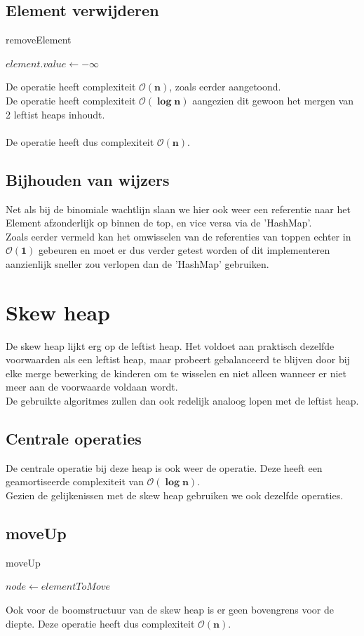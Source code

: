 \documentclass[a4paper,12pt]{report}
\newcommand{\bigO}[1]{$\bm{\mathcal{O}(#1)}$} %
\begin{document}
\subsection{Element verwijderen}
\begin{algorithm}[H]
\caption{removeElement}
\SetAlgoLined	
\DontPrintSemicolon
$element.value \gets -\infty$\;
\;
\;
\end{algorithm}
De  operatie heeft complexiteit \bigO{n}, zoals eerder aangetoond. \\
De  operatie heeft complexiteit \bigO{\log n} aangezien dit gewoon het mergen van 2 leftist heaps inhoudt. \\ \\ 
De  operatie heeft dus complexiteit \bigO{n}.

\subsection{Bijhouden van wijzers}
Net als bij de binomiale wachtlijn slaan we hier ook weer een referentie naar het Element afzonderlijk op binnen de top, en vice versa via de 'HashMap'. \\ 
Zoals eerder vermeld kan het omwisselen van de referenties van toppen echter in \bigO{1} gebeuren en moet er dus verder getest worden of dit implementeren aanzienlijk sneller zou verlopen dan de 'HashMap' gebruiken.
\newpage
\section{Skew heap}
De skew heap lijkt erg op de leftist heap. Het voldoet aan praktisch dezelfde voorwaarden als een leftist heap, maar probeert gebalanceerd te blijven door bij elke merge bewerking de kinderen om te wisselen en niet alleen wanneer er niet meer aan de voorwaarde voldaan wordt. \\
De gebruikte algoritmes zullen dan ook redelijk analoog lopen met de leftist heap.
\subsection{Centrale operaties}
De centrale operatie bij deze heap is ook weer de  operatie. Deze heeft een geamortiseerde complexiteit van \bigO{\log n}. \\
Gezien de gelijkenissen met de skew heap gebruiken we ook dezelfde operaties.
\subsection{moveUp}
\begin{algorithm}[H]
\caption{moveUp}
\SetAlgoLined	
\DontPrintSemicolon
$node \gets elementToMove$\;
\end{algorithm}
Ook voor de boomstructuur van de skew heap is er geen bovengrens voor de diepte. Deze operatie heeft dus complexiteit \bigO{n}.
\end{document}
